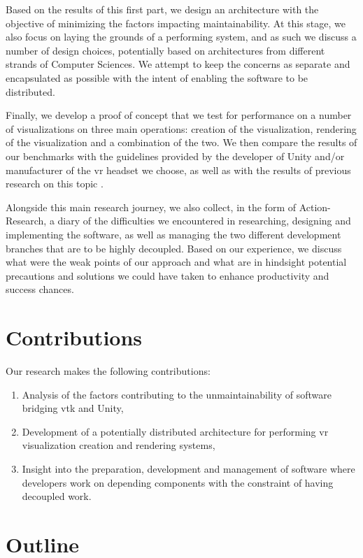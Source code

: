 Based on the results of this first part, we design an architecture with the objective of minimizing the factors impacting maintainability. At this stage, we also focus on laying the grounds of a performing system, and as such we discuss a number of design choices, potentially based on architectures from different strands of Computer Sciences. We attempt to keep the concerns as separate and encapsulated as possible with the intent of enabling the software to be distributed.

Finally, we develop a proof of concept that we test for performance on a number of visualizations on three main operations: creation of the visualization, rendering of the visualization and a combination of the two. We then compare the results of our benchmarks with the guidelines provided by the developer of Unity and/or manufacturer of the \acrshort{vr} headset we choose, as well as with the results of previous research on this topic \cite{dreuning_visual_2016, wheeler_virtual_2018}.

Alongside this main research journey, we also collect, in the form of Action-Research, a diary of the difficulties we encountered in researching, designing and implementing the software, as well as managing the two different development branches that are to be highly decoupled. Based on our experience, we discuss what were the weak points of our approach and what are in hindsight potential precautions and solutions we could have taken to enhance productivity and success chances.

\section{Contributions}

Our research makes the following contributions:

\begin{enumerate}
	\item Analysis of the factors contributing to the unmaintainability of software bridging \acrshort{vtk} and Unity,
	\item Development of a potentially distributed architecture for performing \acrshort{vr} visualization creation and rendering systems,
	\item Insight into the preparation, development and management of software where developers work on depending components with the constraint of having decoupled work.
\end{enumerate}

\section{Outline}

